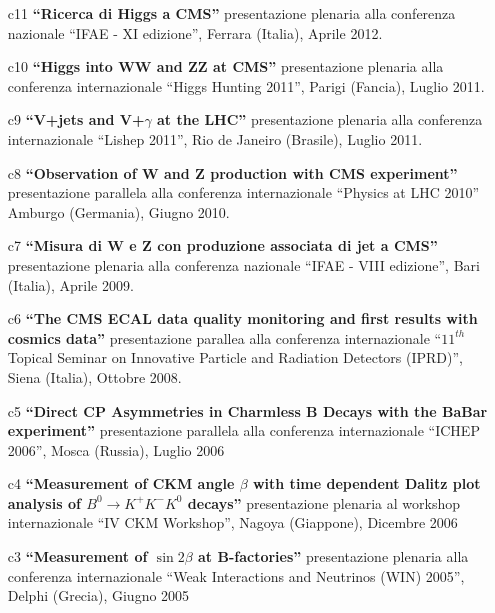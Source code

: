 \documentclass[11pt,twoside,a4paper]{article}
\begin{document}
\begin{enumerate}
\item[c11]
  {\bf ``Ricerca di Higgs a CMS''}
  presentazione plenaria alla conferenza nazionale ``IFAE - XI edizione'',
  Ferrara (Italia), Aprile 2012.
  \vspace{2mm}

\item[c10] {\bf ``Higgs into WW and ZZ at CMS''} presentazione
  plenaria alla conferenza internazionale ``Higgs Hunting 2011'',
  Parigi (Fancia), Luglio 2011.
  \vspace{2mm}

\item[c9] {\bf ``V+jets and V+$\gamma$ at the LHC''} presentazione
  plenaria alla conferenza internazionale ``Lishep 2011'', Rio de
  Janeiro (Brasile), Luglio 2011.
  \vspace{2mm}

\item[c8] {\bf ``Observation of W and Z production with CMS
  experiment'' } presentazione parallela alla conferenza
  internazionale ``Physics at LHC 2010'' Amburgo (Germania), Giugno
  2010.
  \vspace{2mm}

\item[c7] {\bf ``Misura di W e Z con produzione associata di jet a
  CMS''} presentazione plenaria alla conferenza nazionale ``IFAE -
  VIII edizione'', Bari (Italia), Aprile 2009.
  \vspace{2mm}

\item[c6] {\bf ``The CMS ECAL data quality monitoring and first
  results with cosmics data''} presentazione parallea alla conferenza
  internazionale ``$11^{th}$ Topical Seminar on Innovative Particle
  and Radiation Detectors (IPRD)'', Siena (Italia), Ottobre 2008.
  \vspace{2mm}

\item[c5] {\bf ``Direct CP Asymmetries in Charmless B Decays with the
  BaBar experiment''} presentazione parallela alla conferenza
  internazionale ``ICHEP 2006'', Mosca (Russia), Luglio 2006
  \vspace{2mm}

\item[c4] {\bf ``Measurement of CKM angle $\beta$ with time dependent
  Dalitz plot analysis of $B^0\rightarrow K^+K^-K^0$ decays''}
  presentazione plenaria al workshop internazionale ``IV CKM
  Workshop'', Nagoya (Giappone), Dicembre 2006

\item[c3] {\bf ``Measurement of $\sin 2\beta$ at B-factories''}
  presentazione plenaria alla conferenza internazionale ``Weak
  Interactions and Neutrinos (WIN) 2005'', Delphi (Grecia), Giugno
  2005
  \vspace{2mm}


\end{enumerate}
\end{document}
